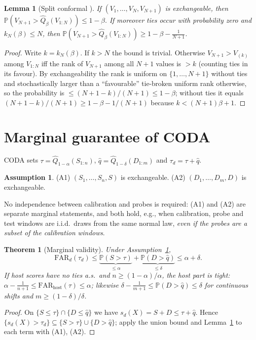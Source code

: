 \documentclass[conference]{IEEEtran}
\newtheorem{theorem}{Theorem}
\newtheorem{lemma}{Lemma}
\theoremstyle{definition}
\newtheorem{assumption}{Assumption}
\theoremstyle{remark}
\newcommand{\Q}{\widehat Q}
\newcommand{\Prob}{\mathbb P}
\newcommand{\FAR}{\mathrm{FAR}}
\begin{document}
\begin{lemma}[Split conformal \cite{vovk2005,lei2018,angelopoulos2023}]\label{lem:cp}
If $(V_1,\dots,V_N,V_{N+1})$ is exchangeable, then $\Prob(V_{N+1}>\Q_\beta(V_{1:N}))\le 1-\beta$. If moreover ties occur with probability zero and $k_N(\beta)\le N$, then $\Prob(V_{N+1}>\Q_\beta(V_{1:N}))\ge 1-\beta-\tfrac{1}{N+1}$.
\end{lemma}
\begin{proof}
Write $k=k_N(\beta)$. If $k>N$ the bound is trivial. Otherwise $V_{N+1}>V_{(k)}$ among $V_{1:N}$ iff the rank of $V_{N+1}$ among all $N+1$ values is $>k$ (counting ties in its favour). By exchangeability the rank is uniform on $\{1,\dots,N+1\}$ without ties and stochastically larger than a ``favourable'' tie-broken uniform rank otherwise, so the probability is $\le (N+1-k)/(N+1)\le 1-\beta$; without ties it equals $(N+1-k)/(N+1)\ge 1-\beta-1/(N+1)$ because $k<(N+1)\beta+1$.
\end{proof}

\section{Marginal guarantee of CODA}
CODA sets $\tau=\Q_{1-\alpha}(S_{1:n})$, $\hat q=\Q_{1-\delta}(D_{1:m})$ and $\tau_d=\tau+\hat q$.

\begin{assumption}\label{ass:exch}
(A1) $(S_1,\dots,S_n,S)$ is exchangeable. (A2) $(D_1,\dots,D_m,D)$ is exchangeable.
\end{assumption}
No independence between calibration and probes is required: (A1) and (A2) are separate marginal statements, and both hold, e.g., when calibration, probe and test windows are i.i.d.\ draws from the same normal law, \emph{even if the probes are a subset of the calibration windows}.

\begin{theorem}[Marginal validity]\label{thm:coda}
Under Assumption~\ref{ass:exch},
\[
\FAR_d(\tau_d)\le \underbrace{\Prob(S>\tau)}_{\le\alpha}+\underbrace{\Prob(D>\hat q)}_{\le\delta}\le\alpha+\delta .
\]
If host scores have no ties a.s.\ and $n\ge(1-\alpha)/\alpha$, the host part is tight: $\alpha-\tfrac{1}{n+1}\le \FAR_{\mathrm{host}}(\tau)\le\alpha$; likewise $\delta-\tfrac{1}{m+1}\le\Prob(D>\hat q)\le\delta$ for continuous shifts and $m\ge(1-\delta)/\delta$.
\end{theorem}
\begin{proof}
On $\{S\le\tau\}\cap\{D\le\hat q\}$ we have $s_d(X)=S+D\le\tau+\hat q$. Hence $\{s_d(X)>\tau_d\}\subseteq\{S>\tau\}\cup\{D>\hat q\}$; apply the union bound and Lemma~\ref{lem:cp} to each term with (A1), (A2).
\end{proof}
\end{document}
